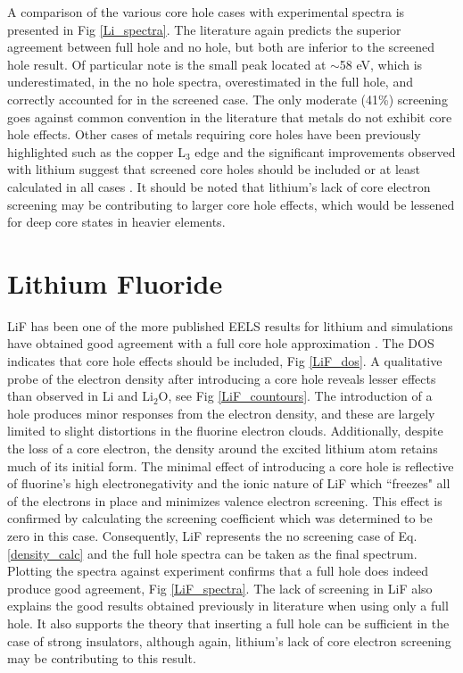A comparison of the various core hole cases with experimental spectra is presented in Fig \ref{Li_spectra}. The literature again predicts the superior agreement between full hole and no hole, but both are inferior to the screened hole result.  Of particular note is the small peak located at $ \sim$58 eV, which is underestimated, in the no hole spectra, overestimated in the full hole, and correctly accounted for in the screened case.  The only moderate (41\%) screening goes against common convention in the literature that metals do not exhibit core hole effects.  Other cases of metals requiring core holes have been previously highlighted such as the copper L$_3$ edge and the significant improvements observed with lithium suggest that screened core holes should be included or at least calculated in all cases \cite{hebert_improvement_2003}.  It should be noted that lithium's lack of core electron screening may be contributing to larger core hole effects, which would be lessened for deep core states in heavier elements. 

\section{Lithium Fluoride}
LiF has been one of the more published EELS results for lithium and simulations have obtained good agreement with a full core hole approximation \cite{gao_theory_2008, mauchamp_ab_2006}.  The DOS indicates that core hole effects should be included, Fig \ref{LiF_dos}. A qualitative probe of the electron density after introducing a core hole reveals lesser effects than observed in Li and $ \mathrm{Li_2O} $, see Fig \ref{LiF_countours}.  The introduction of a hole produces minor responses from the electron density, and these are largely limited to slight distortions in the fluorine electron clouds. Additionally, despite the loss of a core electron, the density around the excited lithium atom retains much of its initial form. The minimal effect of introducing a core hole is reflective of fluorine's high electronegativity and the ionic nature of LiF which ``freezes" all of the electrons in place and minimizes valence electron screening.  This effect is confirmed by calculating the screening coefficient which was determined to be zero in this case. Consequently, LiF represents the no screening case of Eq. \ref{density_calc} and the full hole spectra can be taken as the final spectrum.  Plotting the spectra against experiment confirms that a full hole does indeed produce good agreement, Fig \ref{LiF_spectra}.  The lack of screening in LiF also explains the good results obtained previously in literature when using only a full hole.  It also supports the theory that inserting a full hole can be sufficient in the case of strong insulators, although again, lithium's lack of core electron screening may be contributing to this result.

